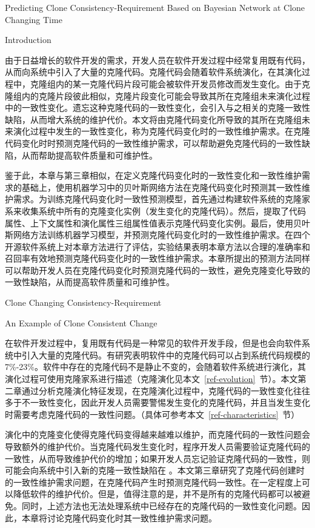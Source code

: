 
{Predicting Clone Consistency-Requirement Based on Bayesian Network at Clone Changing Time}

{Introduction}

由于日益增长的软件开发的需求，开发人员在软件开发过程中经常复用既有代码，从而向系统中引入了大量的克隆代码。克隆代码会随着软件系统演化，在其演化过程中，克隆组内的某一克隆代码片段可能会被软件开发员修改而发生变化。由于克隆组内的克隆片段彼此相似，克隆片段变化可能会导致其所在克隆组未来演化过程中的一致性变化。遗忘这种克隆代码的一致性变化，会引入与之相关的克隆一致性缺陷，从而增大系统的维护代价。本文将由克隆代码变化所导致的其所在克隆组未来演化过程中发生的一致性变化，称为克隆代码变化时的一致性维护需求。在克隆代码变化时时预测克隆代码的一致性维护需求，可以帮助避免克隆代码的一致性缺陷，从而帮助提高软件质量和可维护性。

鉴于此，本章与第三章相似，在定义克隆代码变化时的一致性变化和一致性维护需求的基础上，使用机器学习中的贝叶斯网络方法在克隆代码变化时预测其一致性维护需求。为训练克隆代码变化时一致性预测模型，首先通过构建软件系统的克隆家系来收集系统中所有的克隆变化实例（发生变化的克隆代码）。然后，提取了代码属性、上下文属性和演化属性三组属性值表示克隆代码变化实例。最后，使用贝叶斯网络方法训练机器学习模型，并预测克隆代码变化时的一致性维护需求。在四个开源软件系统上对本章方法进行了评估，实验结果表明本章方法以合理的准确率和召回率有效地预测克隆代码变化时的一致性维护需求。本章所提出的预测方法同样可以帮助开发人员在克隆代码变化时预测克隆代码的一致性，避免克隆变化导致的一致性缺陷，从而提高软件质量和可维护性。

{Clone Changing Consistency-Requirement}

{An Example of Clone Consistent Change }

在软件开发过程中，复用既有代码是一种常见的软件开发手段，但是也会向软件系统中引入大量的克隆代码。有研究表明软件中的克隆代码可以占到系统代码规模的7\%-23\%\cite{koschke2007survey}。软件中存在的克隆代码不是静止不变的，会随着软件系统进行演化，其演化过程可使用克隆家系进行描述\cite{kim2005empirical}（克隆演化见本文~\ref{ref-evolution}~节）。本文第二章通过分析克隆演化特征发现，在克隆演化过程中，克隆代码的一致性变化往往多于不一致性变化，因此开发人员需要警惕发生变化的克隆代码，并且当发生变化时需要考虑克隆代码的一致性问题。（具体可参考本文~\ref{ref-characteristics}~节）

演化中的克隆变化使得克隆代码变得越来越难以维护，而克隆代码的一致性问题会导致额外的维护代价。当克隆代码发生变化时，程序开发人员需要验证克隆代码的一致性，从而导致维护代价的增加；如果开发人员忘记验证克隆代码的一致性，则可能会向系统中引入新的克隆一致性缺陷在\cite{bettenburg2009empirical} \cite {juergens2009code}。本文第三章研究了克隆代码创建时的一致性维护需求问题，在克隆代码产生时预测克隆代码一致性。在一定程度上可以降低软件的维护代价。但是，值得注意的是，并不是所有的克隆代码都可以被避免。同时，上述方法也无法处理系统中已经存在的克隆代码的一致性变化问题。因此，本章将讨论克隆代码变化时其一致性维护需求问题。

